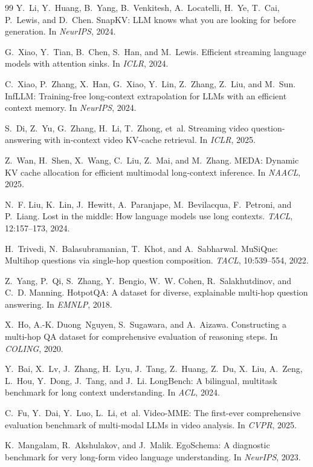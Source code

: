 \documentclass[11pt]{article}
\begin{document}
\begin{thebibliography}{99}
Y.~Li, Y.~Huang, B.~Yang, B.~Venkitesh, A.~Locatelli, H.~Ye, T.~Cai, P.~Lewis, and D.~Chen.
SnapKV: LLM knows what you are looking for before generation.
In \emph{NeurIPS}, 2024.

G.~Xiao, Y.~Tian, B.~Chen, S.~Han, and M.~Lewis.
Efficient streaming language models with attention sinks.
In \emph{ICLR}, 2024.

C.~Xiao, P.~Zhang, X.~Han, G.~Xiao, Y.~Lin, Z.~Zhang, Z.~Liu, and M.~Sun.
InfLLM: Training-free long-context extrapolation for LLMs with an efficient context memory.
In \emph{NeurIPS}, 2024.

S.~Di, Z.~Yu, G.~Zhang, H.~Li, T.~Zhong, et~al.
Streaming video question-answering with in-context video KV-cache retrieval.
In \emph{ICLR}, 2025.

Z.~Wan, H.~Shen, X.~Wang, C.~Liu, Z.~Mai, and M.~Zhang.
MEDA: Dynamic KV cache allocation for efficient multimodal long-context inference.
In \emph{NAACL}, 2025.

N.~F. Liu, K.~Lin, J.~Hewitt, A.~Paranjape, M.~Bevilacqua, F.~Petroni, and P.~Liang.
Lost in the middle: How language models use long contexts.
\emph{TACL}, 12:157--173, 2024.

H.~Trivedi, N.~Balasubramanian, T.~Khot, and A.~Sabharwal.
MuSiQue: Multihop questions via single-hop question composition.
\emph{TACL}, 10:539--554, 2022.

Z.~Yang, P.~Qi, S.~Zhang, Y.~Bengio, W.~W. Cohen, R.~Salakhutdinov, and C.~D. Manning.
HotpotQA: A dataset for diverse, explainable multi-hop question answering.
In \emph{EMNLP}, 2018.

X.~Ho, A.-K. Duong~Nguyen, S.~Sugawara, and A.~Aizawa.
Constructing a multi-hop QA dataset for comprehensive evaluation of reasoning steps.
In \emph{COLING}, 2020.

Y.~Bai, X.~Lv, J.~Zhang, H.~Lyu, J.~Tang, Z.~Huang, Z.~Du, X.~Liu, A.~Zeng, L.~Hou, Y.~Dong, J.~Tang, and J.~Li.
LongBench: A bilingual, multitask benchmark for long context understanding.
In \emph{ACL}, 2024.

C.~Fu, Y.~Dai, Y.~Luo, L.~Li, et~al.
Video-MME: The first-ever comprehensive evaluation benchmark of multi-modal LLMs in video analysis.
In \emph{CVPR}, 2025.

K.~Mangalam, R.~Akshulakov, and J.~Malik.
EgoSchema: A diagnostic benchmark for very long-form video language understanding.
In \emph{NeurIPS}, 2023.

\end{thebibliography}
\end{document}
